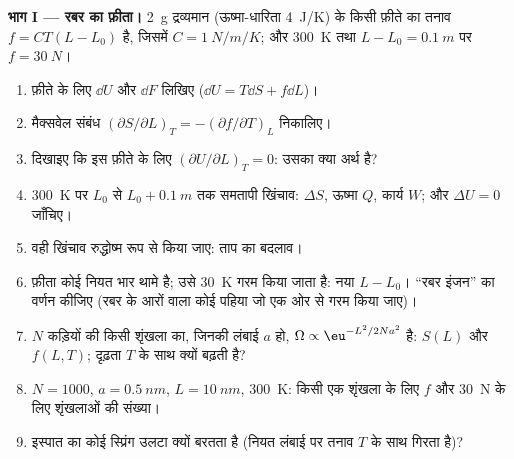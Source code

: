 \begin{problem}\label{pb:b2:thermodynamic-potentials:1}
\textbf{भाग I --- रबर का फ़ीता।}
\qty{2}{g} द्रव्यमान (ऊष्मा-धारिता \qty{4}{J/K}) के किसी फ़ीते का तनाव
$f = CT(L - L_0)$ है, जिसमें $C = \qty{1}{N/m/K}$; और \qty{300}{K} तथा $L - L_0 =
\qty{0.1}{m}$ पर $f = \qty{30}{N}$।
\begin{enumerate}
  \item फ़ीते के लिए $\dd U$ और $\dd F$ लिखिए ($\dd U = T\dd S + f\dd L$)।
  \item मैक्सवेल संबंध $(\partial S/\partial L)_T = -(\partial
        f/\partial T)_L$ निकालिए।
  \item दिखाइए कि इस फ़ीते के लिए $(\partial U/\partial L)_T = 0$: उसका क्या
        अर्थ है?
  \item \qty{300}{K} पर $L_0$ से $L_0 + \qty{0.1}{m}$ तक समतापी खिंचाव:
        $\Delta S$, ऊष्मा $Q$, कार्य $W$; और $\Delta U = 0$ जाँचिए।
  \item वही खिंचाव रुद्धोष्म रूप से किया जाए: ताप का बदलाव।
  \item फ़ीता कोई नियत भार थामे है; उसे \qty{30}{K} गरम किया जाता है: नया
        $L - L_0$। ``रबर इंजन'' का वर्णन कीजिए (रबर के आरों वाला कोई पहिया
        जो एक ओर से गरम किया जाए)।
  \item $N$ कड़ियों की किसी शृंखला का, जिनकी लंबाई $a$ हो, $\Omega \propto \eu^{-L^2/2Na^2}$ है:
        $S(L)$ और $f(L,T)$; दृढ़ता $T$ के साथ क्यों बढ़ती है?
  \item $N = 1000$, $a = \qty{0.5}{nm}$, $L = \qty{10}{nm}$, \qty{300}{K}: किसी एक
        शृंखला के लिए $f$ और \qty{30}{N} के लिए शृंखलाओं की संख्या।
  \item इस्पात का कोई स्प्रिंग उलटा क्यों बरतता है (नियत लंबाई पर तनाव
        $T$ के साथ गिरता है)?
\end{enumerate}


\end{problem}
